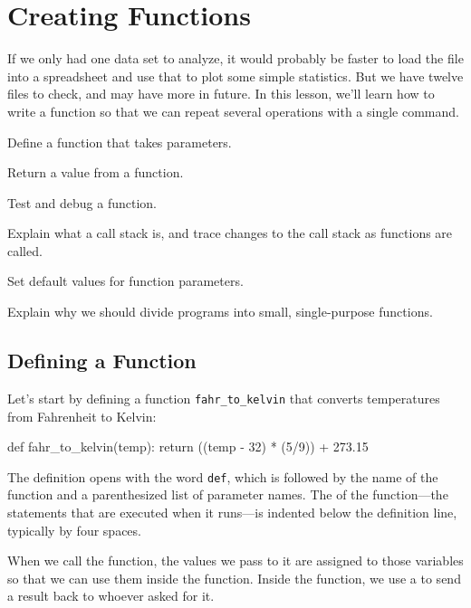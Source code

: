 \section{Creating Functions}

If we only had one data set to analyze, it would probably be faster to
load the file into a spreadsheet and use that to plot some simple
statistics. But we have twelve files to check, and may have more in
future. In this lesson, we'll learn how to write a function so that we
can repeat several operations with a single command.

\begin{objectives}
\begin{swcitemize}
\item
  Define a function that takes parameters.
\item
  Return a value from a function.
\item
  Test and debug a function.
\item
  Explain what a call stack is, and trace changes to the call stack as
  functions are called.
\item
  Set default values for function parameters.
\item
  Explain why we should divide programs into small, single-purpose
  functions.
\end{swcitemize}
\end{objectives}

\subsection{Defining a Function}

Let's start by defining a function \texttt{fahr\_to\_kelvin} that
converts temperatures from Fahrenheit to Kelvin:

\begin{VerbIn}
def fahr_to_kelvin(temp):
    return ((temp - 32) * (5/9)) + 273.15
\end{VerbIn}

The definition opens with the word \texttt{def}, which is followed by
the name of the function and a parenthesized list of parameter names.
The  of the function---the statements
that are executed when it runs---is indented below the definition line,
typically by four spaces.

When we call the function, the values we pass to it are assigned to
those variables so that we can use them inside the function. Inside the
function, we use a  to
send a result back to whoever asked for it.

